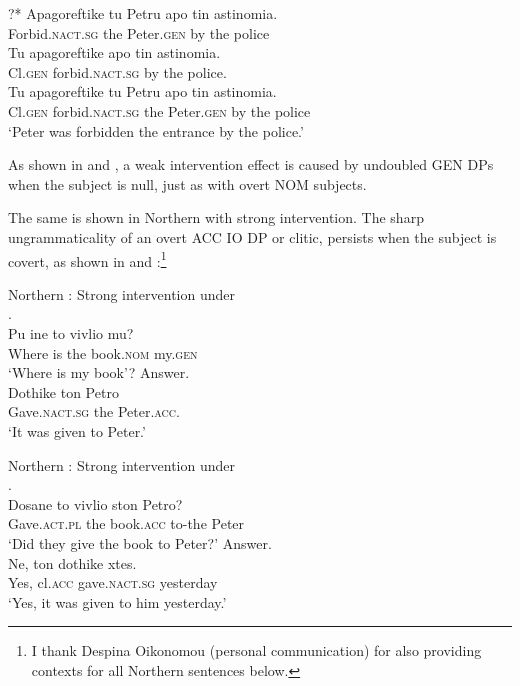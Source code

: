 \documentclass[output=paper]{LSP/langsci}
\begin{document}
\gll ?* Apagoreftike   tu Petru apo tin astinomia.\\
{} Forbid.\textsc{nact.sg} the Peter.\textsc{gen} by the police\\

\gll Tu apagoreftike apo tin astinomia.\\
Cl.\textsc{gen} forbid.\textsc{nact.sg} by the police.\\

 
\gll Tu apagoreftike tu Petru apo tin astinomia.\\
Cl.\textsc{gen} forbid.\textsc{nact.sg} the Peter.\textsc{gen} by the police\\

\glt ‘Peter was forbidden the entrance by the police.’
\z 

As shown in  and , a weak intervention effect is caused by undoubled GEN DPs when the subject is null, just as with overt NOM subjects.

The same is shown in Northern  with strong intervention. The sharp ungrammaticality of an overt ACC IO DP or clitic, persists when the subject is covert, as shown in  and :\footnote{I thank Despina Oikonomou (personal communication) for also providing contexts for all Northern  sentences below.}

\ea%
\label{ex:anagnost:25}
Northern : Strong intervention under \\
\ea\label{ex:anagnost:25a}
.\\
\gll    Pu ine to vivlio mu?\\
 Where   is the book.\textsc{nom} my.\textsc{gen}\\
\glt ‘Where is my book’?
\ex Answer.\\
\gll * Dothike ton  Petro  \\
 {} Gave.\textsc{nact.sg} the  Peter.\textsc{acc}.\\
\glt ‘It was given to Peter.’
\z
\z

\ea%
\label{ex:anagnost:26} Northern : Strong intervention under   \\
\ea\label{ex:anagnost:26a}
.\\
\gll   Dosane to vivlio ston Petro?\\
 Gave.\textsc{act.pl} the book.\textsc{acc} to-the Peter\\
\glt ‘Did they give the book to Peter?’
\ex Answer.\\  
\gll * Ne, ton dothike xtes.  \\
 {} Yes, cl.\textsc{acc} gave.\textsc{nact.sg} yesterday        \\
\glt  ‘Yes, it was given to him yesterday.’
\z
\z
\end{document}
